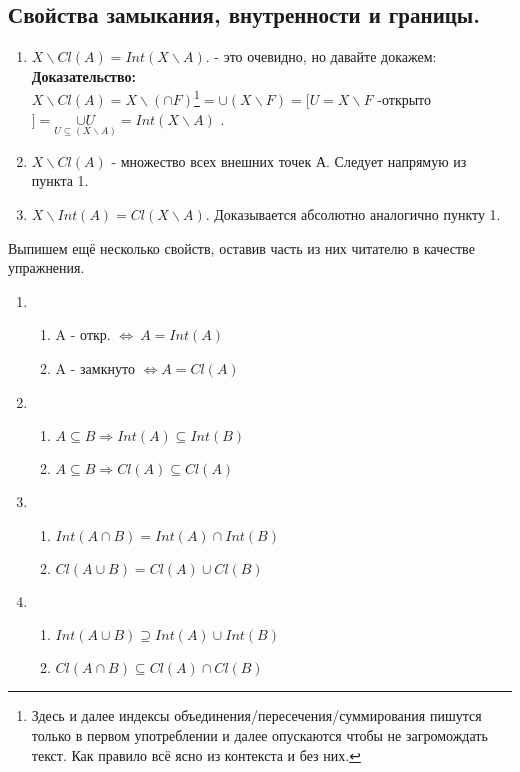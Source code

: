 \subsection{Свойства замыкания, внутренности и границы.}
\begin{enumerate}
\item $X\backslash Cl(A) = Int(X\backslash A)$. - это очевидно, но давайте докажем:
\\ \textbf{Доказательство:}
\\ $X\backslash Cl(A) = X\backslash(\cap F)$\footnote{Здесь и далее индексы объединения/пересечения/суммирования пишутся только в первом употреблении и далее опускаются чтобы не загромождать текст. Как правило всё ясно из контекста и без них.}$=\cup(X\backslash F)=[U = X\backslash F$ -открыто$]=\underset{U\subseteq(X\backslash A)}{\cup U}=Int(X\backslash A)$ .
\item $X\backslash Cl(A)$ - множество всех внешних точек А. Следует напрямую из пункта 1.
\item $X\backslash Int(A) = Cl(X\backslash A)$. Доказывается абсолютно аналогично пункту 1.
\end{enumerate}
Выпишем ещё несколько свойств, оставив часть из них читателю в качестве упражнения.
\begin{enumerate}
\item 
\begin{enumerate}
\item A - откр. $\Longleftrightarrow ~A = Int(A)$
\item A - замкнуто $\Longleftrightarrow A = Cl(A)$
\end{enumerate}
\item 
\begin{enumerate}
\item $A\subseteq B \Longrightarrow Int(A)\subseteq Int(B)$
\item $A\subseteq B \Longrightarrow Cl(A)\subseteq Cl(A)$
\end{enumerate}
\item
\begin{enumerate}
\item $Int(A\cap B) = Int(A)\cap Int(B)$
\item $Cl(A\cup B) = Cl(A)\cup Cl(B)$
\end{enumerate}
\item
\begin{enumerate}
\item $Int(A\cup B) \supseteq Int(A)\cup Int(B)$
\item $Cl(A\cap B) \subseteq Cl(A)\cap Cl(B)$
\end{enumerate}
\end{enumerate}
